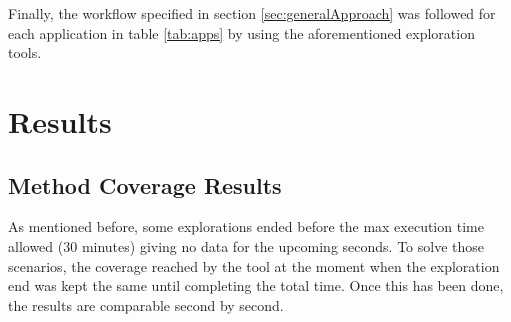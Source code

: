 \begin{table}[t]
	\centering
	\caption{Applications used for the study} \label{tab:apps}
\end{table}

Finally, the workflow specified in section \ref{sec:generalApproach} was followed for each application in table \ref{tab:apps} by using the aforementioned exploration tools. 

\section{Results}\label{sec:results}

\subsection{Method Coverage Results}\label{sec:coverageResults}

As mentioned before, some explorations ended before the max execution time allowed (30 minutes) giving no data for the upcoming seconds. To solve those scenarios, the coverage reached by the tool at the moment when the exploration end was kept the same until completing the total time. Once this has been done, the results are comparable second by second.

